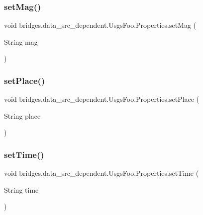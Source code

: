 \subsubsection{\texorpdfstring{set\+Mag()}{setMag()}}
{\footnotesize\ttfamily void bridges.\+data\+\_\+src\+\_\+dependent.\+Usgs\+Foo.\+Properties.\+set\+Mag (\begin{DoxyParamCaption}\item[{String}]{mag }\end{DoxyParamCaption})}

\hypertarget{classbridges_1_1data__src__dependent_1_1_usgs_foo_1_1_properties_a62e8d04129240c4f04b880ab2fef1f04}{}\label{classbridges_1_1data__src__dependent_1_1_usgs_foo_1_1_properties_a62e8d04129240c4f04b880ab2fef1f04} 
\subsubsection{\texorpdfstring{set\+Place()}{setPlace()}}
{\footnotesize\ttfamily void bridges.\+data\+\_\+src\+\_\+dependent.\+Usgs\+Foo.\+Properties.\+set\+Place (\begin{DoxyParamCaption}\item[{String}]{place }\end{DoxyParamCaption})}

\hypertarget{classbridges_1_1data__src__dependent_1_1_usgs_foo_1_1_properties_a846ac9ec8c49cd261a7dec80844fef27}{}\label{classbridges_1_1data__src__dependent_1_1_usgs_foo_1_1_properties_a846ac9ec8c49cd261a7dec80844fef27} 
\subsubsection{\texorpdfstring{set\+Time()}{setTime()}}
{\footnotesize\ttfamily void bridges.\+data\+\_\+src\+\_\+dependent.\+Usgs\+Foo.\+Properties.\+set\+Time (\begin{DoxyParamCaption}\item[{String}]{time }\end{DoxyParamCaption})}

